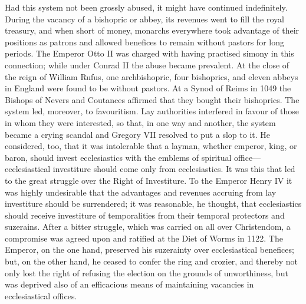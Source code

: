 \documentclass{book}
\begin{document}
Had this system not been grossly abused, it might have continued indefinitely. During the vacancy of a bishopric or abbey, its revenues went to fill the royal treasury, and when short of money, monarchs everywhere took advantage of their positions as patrons and allowed benefices to remain without pastors for long periods. The Emperor Otto II was charged with having practised simony in this connection; while under Conrad II the abuse became prevalent. At the close of the reign of William Rufus, one archbishopric, four bishoprics, and eleven abbeys in England were found to be without pastors. At a Synod of Reims in 1049 the Bishops of Nevers and Coutances affirmed that they bought their bishoprics. The system led, moreover, to favouritism. Lay authorities interfered in favour of those in whom they were interested, so that, in one way and another, the system became a crying scandal and Gregory VII resolved to put a slop to it. He considered, too, that it was intolerable that a layman, whether emperor, king, or baron, should invest ecclesiastics with the emblems of spiritual office—ecclesiastical investiture should come only from ecclesiastics. It was this that led to the great struggle over the Right of Investiture. To the Emperor Henry IV it was highly undesirable that the advantages and revenues accruing from lay investiture should be surrendered; it was reasonable, he thought, that ecclesiastics should receive investiture of temporalities from their temporal protectors and suzerains. After a bitter struggle, which was carried on all over Christendom, a compromise was agreed upon and ratified at the Diet of Worms in 1122. The Emperor, on the one hand, preserved his suzerainty over ecclesiastical benefices; but, on the other hand, he ceased to confer the ring and crozier, and thereby not only lost the right of refusing the election on the grounds of unworthiness, but was deprived also of an efficacious means of maintaining vacancies in ecclesiastical offices.
\end{document}
